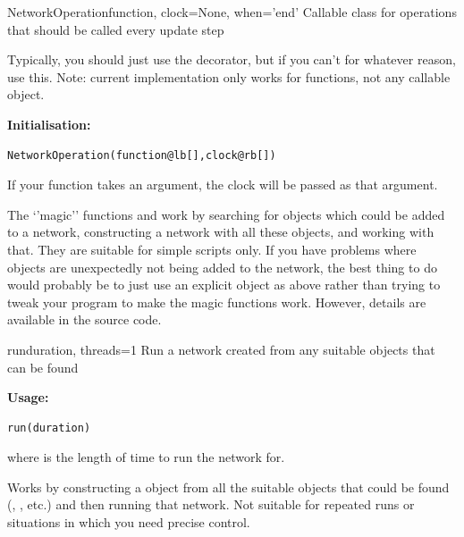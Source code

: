 \documentclass[letterpaper,10pt]{manual}
\begin{document}
\hypertarget{brian.NetworkOperation}{}\begin{classdesc}{NetworkOperation}{function, clock=None, when='end'}
Callable class for operations that should be called every update step

Typically, you should just use the \hyperlink{brian.network_operation}{} decorator, but if you
can't for whatever reason, use this. Note: current implementation only works for
functions, not any callable object.

\textbf{Initialisation:}

\begin{Verbatim}[commandchars=@\[\]]
NetworkOperation(function@lb[],clock@rb[])
\end{Verbatim}

If your function takes an argument, the clock will be passed
as that argument.
\end{classdesc}

The `'magic'' functions \hyperlink{brian.run}{} and \hyperlink{brian.reinit}{} work by searching for
objects which could be added to a network, constructing a network with all
these objects, and working with that. They are suitable for simple scripts
only. If you have problems where objects are unexpectedly not being added
to the network, the  best thing to do would probably be to just use an
explicit \hyperlink{brian.Network}{} object as above rather than trying to tweak your
program to make the magic functions work. However, details are available
in the  source code.


\hypertarget{brian.run}{}\begin{funcdesc}{run}{duration, threads=1}
Run a network created from any suitable objects that can be found

\textbf{Usage:}

\begin{Verbatim}[commandchars=@\[\]]
run(duration)
\end{Verbatim}

where  is the length of time to run the network for.

Works by constructing a \hyperlink{brian.MagicNetwork}{} object from all the suitable
objects that could be found (\hyperlink{brian.NeuronGroup}{}, \hyperlink{brian.Connection}{}, etc.) and
then running that network. Not suitable for repeated runs or situations
in which you need precise control.
\end{funcdesc}
\end{document}
